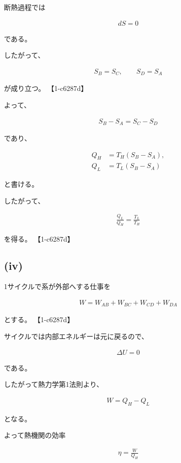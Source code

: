 \documentclass[platex,dvipdfmx,a4paper]{jsarticle}
\begin{document}
断熱過程では

\begin{align*}
dS=0
\end{align*}

である。

したがって、

\begin{align*}
S_B=S_C,
\qquad
S_D=S_A
\end{align*}

が成り立つ。 【1-c6287d】

よって、

\begin{align*}
S_B-S_A
=
S_C-S_D
\end{align*}

であり、

\begin{align*}
Q_H
&=
T_H(S_B-S_A),
\\
Q_L
&=
T_L(S_B-S_A)
\end{align*}

と書ける。

したがって、

\begin{align*}
\frac{Q_L}{Q_H}
=
\frac{T_L}{T_H}
\end{align*}

を得る。 【1-c6287d】

\subsection{(iv)}

1サイクルで系が外部へする仕事を

\begin{align*}
W
=
W_{AB}
+
W_{BC}
+
W_{CD}
+
W_{DA}
\end{align*}

とする。 【1-c6287d】

サイクルでは内部エネルギーは元に戻るので、

\begin{align*}
\Delta U=0
\end{align*}

である。

したがって熱力学第1法則より、

\begin{align*}
W
=
Q_H-Q_L
\end{align*}

となる。

よって熱機関の効率

\begin{align*}
\eta
=
\frac{W}{Q_H}
\end{align*}
\end{document}
